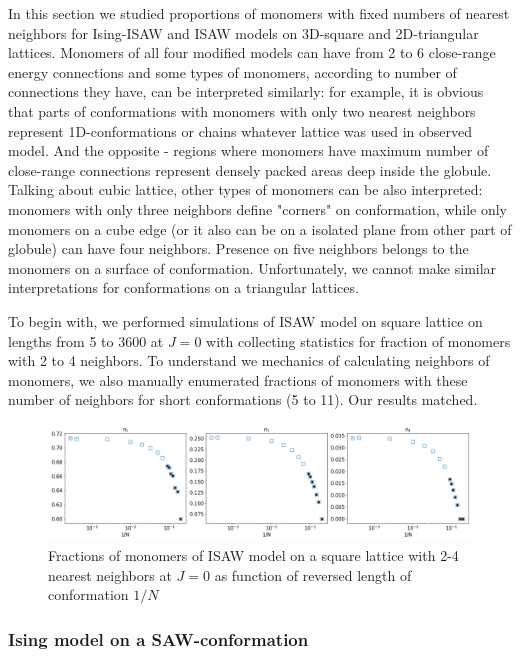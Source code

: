 \documentclass[aps,pre,amssymb,amsmath,twocolumn,floatfix]{revtex4-2}
\begin{document}
In this section we studied proportions of monomers with fixed numbers of nearest neighbors for Ising-ISAW and ISAW models on 3D-square and 2D-triangular lattices. Monomers of all four modified models can have from 2 to 6 close-range energy connections and some types of monomers, according to number of connections they have, can be interpreted similarly: for example, it is obvious that parts of conformations with monomers with only two nearest neighbors represent 1D-conformations or chains whatever lattice was used in observed model. And the opposite - regions where monomers have maximum number of close-range connections represent densely packed areas deep inside the globule. Talking about cubic lattice, other types of monomers can be also interpreted: monomers with only three neighbors define "corners" on conformation, while only monomers on a cube edge (or it also can be on a isolated plane from other part of globule) can have four neighbors. Presence on five neighbors belongs to the monomers on a surface of conformation. Unfortunately, we cannot make similar interpretations for conformations on a triangular lattices.

To begin with, we performed simulations of ISAW model on square lattice on lengths from 5 to 3600 at $J=0$ with collecting statistics for fraction of monomers with 2 to 4 neighbors. To understand we mechanics of calculating neighbors of monomers, we also manually enumerated fractions of monomers with these number of neighbors for short conformations (5 to 11). Our results matched.

\begin{figure}[h!]
    \centering
    \includegraphics[width=\columnwidth]{Images/ISAWJ0_Bulk2-4.png}
    \caption{Fractions of monomers of ISAW model on a square lattice with 2-4 nearest neighbors at $J=0$ as function of reversed length of conformation $1/N$}
    \label{fig:Ising_vs_ISAW}
\end{figure}

\subsubsection{Ising model on a SAW-conformation}
\end{document}
